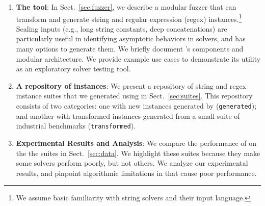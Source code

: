 \begin{enumerate}
    \item \textbf{The \fuzzer{} tool}:
        In Sect.~\ref{sec:fuzzer}, we describe a modular fuzzer that can
        transform and generate \smtfull{} string and regular
        expression (regex) instances.\footnote{We assume basic
        familiarity with string solvers and their input
        language.} Scaling inputs (e.g., long string constants,
        deep concatenations) are particularly useful in identifying asymptotic
        behaviors in solvers, and \fuzzer{} has many options to generate them.
        We briefly document \fuzzer{}'s components and modular architecture.
        We provide example use cases to demonstrate its utility as an
        exploratory solver testing tool.

    \item \textbf{A repository of \smtfull{} instances}:
        We present a repository of \smtfull{} string and regex instance suites
        that we generated using \fuzzer{} in Sect.~\ref{sec:suites}. This
        repository consists of two categories: one with new
        instances generated by \fuzzer{} (\texttt{generated}); and another with
        transformed instances generated from a small suite of industrial
        benchmarks (\texttt{transformed}).

    \item \textbf{Experimental Results and Analysis}:
        We compare the performance of \theSolvers{} on the
        the \fuzzer{} suites \theSuites{} in Sect.~\ref{sec:data}. We
        highlight these suites because they make some solvers perform poorly,
        but not others. We analyze our
        experimental results, and pinpoint algorithmic limitations
        in \us{} that cause poor performance.
\end{enumerate}
